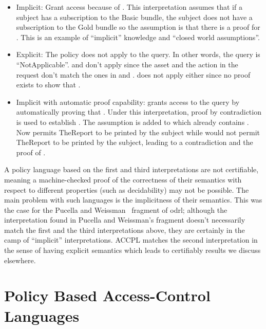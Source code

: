 \begin{itemize}
\item Implicit: Grant access because of . This interpretation assumes that if a subject has a subscription to the Basic bundle, the subject does not have a subscription to the Gold bundle so the assumption is that there is a proof for . This is an example of ``implicit'' knowledge and ``closed world assumptions''.

\item Explicit: The policy does not apply to the query. In other words, the query is ``NotApplicable''.  and  don't apply since the asset and the action in the request don't match the ones in  and .  does not apply either since no proof exists to show that . 

\item Implicit with automatic proof capability: grants access to the query by automatically proving that . Under this interpretation, proof by contradiction is used to establish .  The assumption  is added to  which already contains . Now  permits TheReport to be printed by the subject while  would not permit TheReport to be printed by the subject, leading to a contradiction and the proof of .
\end{itemize}

A policy language based on the first and third interpretations are not certifiable, meaning a machine-checked proof of the correctness of their semantics with respect to different properties (such as decidability) may not be possible. The main problem with such languages is the implicitness of their semantics. This was the case for the Pucella and Weissman~\cite{pucella2006} fragment of \ac{odrl}; although the interpretation found in Pucella and Weissman's fragment doesn't necessarily match the first and the third interpretations above, they are certainly in the camp of ``implicit'' interpretations. \ac{ACCPL} matches the second interpretation in the sense of having explicit semantics which leads to certifiably results we discuss elsewhere.


\section{Policy Based Access-Control Languages}

